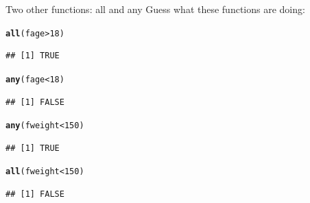 \documentclass{beamer}\usepackage[]{graphicx}\usepackage[]{color}
\makeatletter
\newcommand{\hlnum}[1]{\textcolor[rgb]{0.686,0.059,0.569}{#1}}%
\newcommand{\hlopt}[1]{\textcolor[rgb]{0,0,0}{#1}}%
\newcommand{\hlstd}[1]{\textcolor[rgb]{0.345,0.345,0.345}{#1}}%
\newcommand{\hlkwd}[1]{\textcolor[rgb]{0.737,0.353,0.396}{\textbf{#1}}}%
\newenvironment{kframe}{%
 \def\at@end@of@kframe{}%
 \ifinner\ifhmode%
  \def\at@end@of@kframe{\end{minipage}}%
  \begin{minipage}{\columnwidth}%
 \fi\fi%
 \def\FrameCommand##1{\hskip\@totalleftmargin \hskip-\fboxsep
 \colorbox{shadecolor}{##1}\hskip-\fboxsep
     \hskip-\linewidth \hskip-\@totalleftmargin \hskip\columnwidth}%
 \MakeFramed {\advance\hsize-\width
   \@totalleftmargin\z@ \linewidth\hsize
   \@setminipage}}%
 {\par\unskip\endMakeFramed%
 \at@end@of@kframe}
\newenvironment{knitrout}{}{} %
\renewenvironment{knitrout}{\begin{singlespace}}{\end{singlespace}}
\theoremstyle{mystyle}
\makeatother
\begin{document}
\begin{frame}[fragile]{Two other functions: all and any}
Guess what these functions are doing:
\begin{knitrout}
\color{fgcolor}\begin{kframe}
\begin{alltt}
\hlkwd{all}\hlstd{(fage} \hlopt{>} \hlnum{18}\hlstd{)}
\end{alltt}
\begin{verbatim}
## [1] TRUE
\end{verbatim}
\begin{alltt}
\hlkwd{any}\hlstd{(fage} \hlopt{<} \hlnum{18}\hlstd{)}
\end{alltt}
\begin{verbatim}
## [1] FALSE
\end{verbatim}
\begin{alltt}
\hlkwd{any}\hlstd{(fweight} \hlopt{<} \hlnum{150}\hlstd{)}
\end{alltt}
\begin{verbatim}
## [1] TRUE
\end{verbatim}
\begin{alltt}
\hlkwd{all}\hlstd{(fweight} \hlopt{<} \hlnum{150}\hlstd{)}
\end{alltt}
\begin{verbatim}
## [1] FALSE
\end{verbatim}
\end{kframe}
\end{knitrout}
\end{frame}
\end{document}
